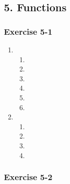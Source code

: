 \subsection* {5. Functions}
\begin{multicols}{3}
\subsubsection*{Exercise 5-1} %
\begin{enumerate}[noitemsep, label=\textbf{\arabic*}. ] 


\item %
\begin{enumerate}[noitemsep, label=\textbf{(\alph*)} ] 
 \item %
\item %
\item %
\item %
\item %
\item %
\end{enumerate}

\item %
\begin{enumerate}[noitemsep, label=\textbf{(\alph*)} ] 
 \item %
 \item %
 \item %
 \item %
\end{enumerate}
\end{enumerate}

\subsubsection*{Exercise 5-2} %
\begin{enumerate}[noitemsep, label=\textbf{\arabic*}. ] 


\end{enumerate}
\end{multicols}
